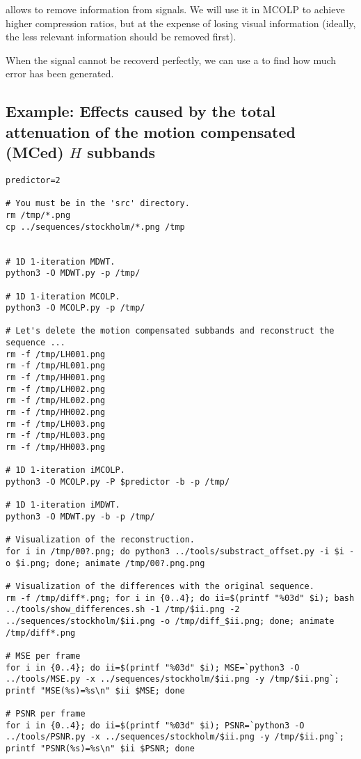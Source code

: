  allows to remove information from
signals. We will use it in MCOLP to achieve higher compression ratios,
but at the expense of losing visual information (ideally, the less
relevant information should be removed first).

When the signal cannot be recoverd perfectly, we can use a
 to find how much error
has been generated.


\subsection*{Example: Effects caused by the total attenuation of the motion compensated (MCed) $H$ subbands}

\begin{verbatim}
predictor=2

# You must be in the 'src' directory.
rm /tmp/*.png
cp ../sequences/stockholm/*.png /tmp


# 1D 1-iteration MDWT.
python3 -O MDWT.py -p /tmp/

# 1D 1-iteration MCOLP.
python3 -O MCOLP.py -p /tmp/

# Let's delete the motion compensated subbands and reconstruct the sequence ...
rm -f /tmp/LH001.png
rm -f /tmp/HL001.png
rm -f /tmp/HH001.png
rm -f /tmp/LH002.png
rm -f /tmp/HL002.png
rm -f /tmp/HH002.png
rm -f /tmp/LH003.png
rm -f /tmp/HL003.png
rm -f /tmp/HH003.png

# 1D 1-iteration iMCOLP.
python3 -O MCOLP.py -P $predictor -b -p /tmp/

# 1D 1-iteration iMDWT.
python3 -O MDWT.py -b -p /tmp/

# Visualization of the reconstruction.
for i in /tmp/00?.png; do python3 ../tools/substract_offset.py -i $i -o $i.png; done; animate /tmp/00?.png.png

# Visualization of the differences with the original sequence.
rm -f /tmp/diff*.png; for i in {0..4}; do ii=$(printf "%03d" $i); bash ../tools/show_differences.sh -1 /tmp/$ii.png -2 ../sequences/stockholm/$ii.png -o /tmp/diff_$ii.png; done; animate /tmp/diff*.png

# MSE per frame
for i in {0..4}; do ii=$(printf "%03d" $i); MSE=`python3 -O ../tools/MSE.py -x ../sequences/stockholm/$ii.png -y /tmp/$ii.png`; printf "MSE(%s)=%s\n" $ii $MSE; done

# PSNR per frame
for i in {0..4}; do ii=$(printf "%03d" $i); PSNR=`python3 -O ../tools/PSNR.py -x ../sequences/stockholm/$ii.png -y /tmp/$ii.png`; printf "PSNR(%s)=%s\n" $ii $PSNR; done
\end{verbatim}

